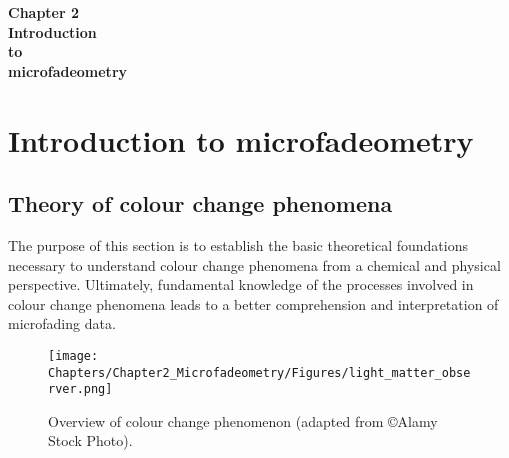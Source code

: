 

            
\pagecolor{mygray}

\begin{titlepage}
   \begin{center}
       \vspace*{3cm}
       {\fontsize{40pt}{46pt}\selectfont \textbf{Chapter 2}}\\       
       \vspace*{3cm}
       {\fontsize{30pt}{36pt}\selectfont \textbf{Introduction} \\[1cm]
        \fontsize{30pt}{36pt}\selectfont \textbf{to} \\[1cm]
        \fontsize{30pt}{36pt}\selectfont \textbf{microfadeometry}} \\          
   \end{center}
\end{titlepage}


\pagecolor{white}
\restoregeometry


\chapter{ Introduction to microfadeometry}
\label{ch:ch2_MFT}




\section{Theory of colour change phenomena}

The purpose of this section is to establish the basic theoretical foundations necessary to understand colour change phenomena from a chemical and physical perspective. Ultimately, fundamental knowledge of the processes involved in colour change phenomena leads to a better comprehension and interpretation of microfading data.\\

\begin{figure*}[!h]
\centering
\texttt{[image: Chapters/Chapter2\_Microfadeometry/Figures/light\_matter\_observer.png]}
\caption[\hspace{0.3cm}Overview of colour change phenomenon]{Overview of colour change phenomenon (adapted from \copyright Alamy Stock Photo).}
\label{fig:light_matter_observer}
\end{figure*}

